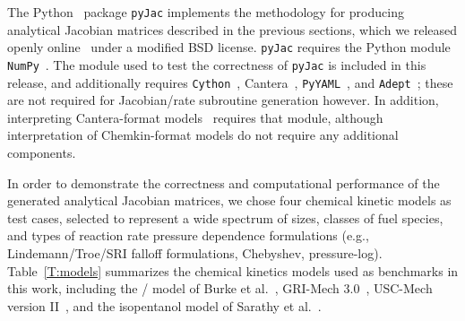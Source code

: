 \documentclass[preprint,12pt]{elsarticle}
\begin{document}
{The Python~\cite{Python:2015} package \texttt{pyJac} implements the methodology for producing analytical Jacobian matrices described in the previous sections, which we released openly online~\cite{Niemeyer:2015im} under a modified BSD license.
\texttt{pyJac} requires the Python module \texttt{NumPy}~\cite{Walt:2011aa}.
The module used to test the correctness of \texttt{pyJac} is included in this release, and additionally requires \texttt{Cython}~\cite{Behnel:2011aa}, Cantera~\cite{Goodwin:2015aa}, \texttt{PyYAML}~\cite{Simonov:2014aa}, and \texttt{Adept}~\cite{adept-v11}; these are not required for Jacobian/rate subroutine generation however.
In addition, interpreting Cantera-format models~\cite{Goodwin:2015aa} requires that module, although interpretation of Chemkin-format models do not require any additional components.

In order to demonstrate the correctness and computational performance of the generated analytical Jacobian matrices, we chose four chemical kinetic models as test cases, selected to represent a wide spectrum of sizes, classes of fuel species, and types of reaction rate pressure dependence formulations (e.g., Lindemann\slash Troe\slash SRI falloff formulations, Chebyshev, pressure-log).
Table~\ref{T:models} summarizes the chemical kinetics models used as benchmarks in this work, including the \slash {} model of Burke et al.~\cite{Burke:2011fh}, GRI-Mech 3.0~\cite{smith_gri-mech_30}, USC-Mech version II~\cite{Wang:2007}, and the isopentanol model of Sarathy et al.~\cite{Sarathy:2013jr}.

}
\end{document}
